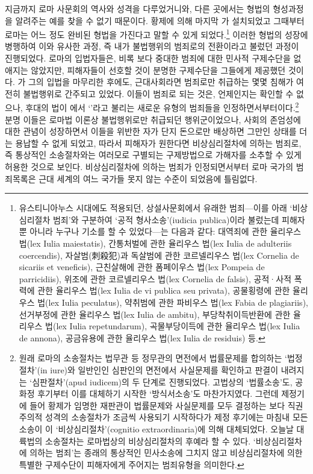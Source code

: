 지금까지 로마 사문회의 역사와 성격을 다루었거니와,
다른 곳에서는 형법의 형성과정을 알려주는 예를 찾을 수 없기 때문이다.
 황제에 의해
마지막 가 설치되었고
그때부터 로마는 어느 정도 완비된 형법을 가진다고 말할 수 있게 되었다.\footnote{%
  유스티니아누스 시대에도 적용되던, 상설사문회에서 유래한 범죄---이를
  아래 `비상심리절차 범죄'와 구분하여
  `공적 형사소송'(iudicia publica)이라 불렀는데 피해자뿐 아니라 누구나
  기소를 할 수 있었다---는 다음과 같다:
  대역죄에 관한 율리우스 법(lex Iulia maiestatis),
  간통처벌에 관한 율리우스 법(lex Iulia de adulteriis coercendis),
  자살범(刺殺犯)과 독살범에 관한 코르넬리우스 법(lex Cornelia de sicariis et veneficis),
  근친살해에 관한 폼페이우스 법(lex Pompeia de parricidiis),
  위조에 관한 코르넬리우스 법(lex Cornelia de falsis),
  공적·사적 폭력에 관한 율리우스 법(lex Iulia de vi publica seu privata),
  공물횡령에 관한 율리우스 법(lex Iulia peculatus),
  약취범에 관한 파비우스 법(lex Fabia de plagiariis),
  선거부정에 관한 율리우스 법(lex Iulia de ambitu),
  부당착취이득반환에 관한 율리우스 법(lex Iulia repetundarum),
  곡물부당이득에 관한 율리우스 법(lex Iulia de annona),
  공금유용에 관한 율리우스 법(lex Iulia de residuis) 등.
   }
이러한 형법의 성장에 병행하여
이와 유사한 과정, 즉
내가 불법행위의 범죄로의 전환이라고 불렀던 과정이 진행되었다.
로마의 입법자들은,
비록 보다 중대한 범죄에 대한
민사적 구제수단을 없애지는 않았지만,
피해자들이 선호할 것이 분명한 구제수단을 그들에게 제공했던 것이다.
가 그의 입법을 마무리한 후에도,
근대사회라면 범죄로만 취급하는
몇몇 침해가 여전히 불법행위로 간주되고 있었다.
이들이 범죄로 되는 것은,
언제인지는 확인할 수 없으나, 후대의
법이 에서
`'라고
불리는 새로운 유형의 범죄들을 인정하면서부터이다.\footnote{%
  원래 로마의 소송절차는 법무관 등 정무관의 면전에서 법률문제를 합의하는
  `법정절차'(in iure)와 일반인인 심판인의 면전에서 사실문제를 확인하고
  판결이 내려지는 `심판절차'(apud iudicem)의 두 단계로
  진행되었다. 고법상의 `법률소송'도, 공화정 후기부터 이를 대체하기 시작한
  `방식서소송'도 마찬가지였다.  그런데 제정기에 들어 황제가 임명한 재판관이
  법률문제와 사실문제를 모두 결정하는 보다 직권주의적 성격의 소송절차가 조금씩
  사용되기 시작하다가 제정 후기에는 마침내 모든 소송이
  이 `비상심리절차'(cognitio extraordinaria)에 의해 대체되었다.
  오늘날 대륙법의 소송절차는 로마법상의 비상심리절차의 후예라 할 수 있다.
  `비상심리절차에 의하는 범죄'는 종래의 통상적인 민사소송에 그치지 않고
  비상심리절차에 의한 특별한 구제수단이 피해자에게 주어지는
  범죄유형을 의미한다. }
분명
이들은
로마법 이론상 불법행위로만 취급되던 행위군이었으나,
사회의 존엄성에 대한 관념이 성장하면서
이들을 위반한 자가 단지 돈으로만 배상하면 그만인 상태를
더는 용납할 수 없게 되었고,
따라서 피해자가 원한다면
비상심리절차에 의하는 범죄로,
즉 통상적인 소송절차와는 여러모로 구별되는 구제방법으로
가해자를 소추할 수 있게 허용한 것으로 보인다.
비상심리절차에 의하는 범죄가 인정되면서부터
로마 국가의 범죄목록은 근대 세계의 여느 국가들 못지 않는 수준이
되었음에 틀림없다.

